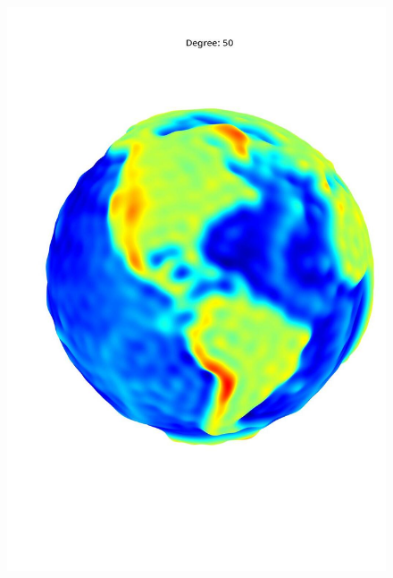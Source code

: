 \documentclass[a4paper]{article}
\theoremstyle{definition}
\begin{document}
\begin{figure}[h!]
\begin{minipage}{.245\textwidth}
        \includegraphics[width=0.95\linewidth]{media/med_50.jpg}
        \label{fig:med50}
    \end{minipage}
    \begin{minipage}{.245\textwidth}
        \centering

\end{minipage}
\end{figure}
\end{document}
